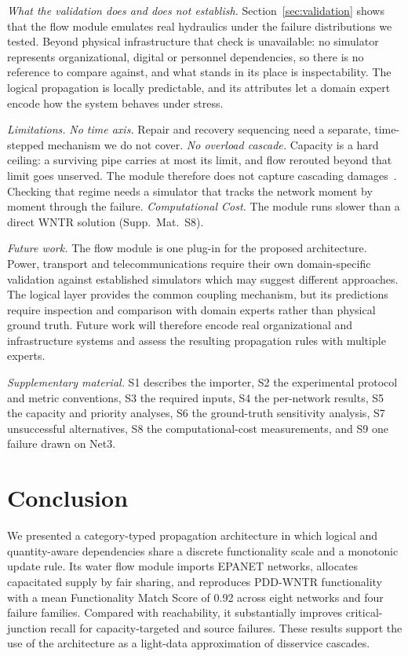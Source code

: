 \documentclass{svproc}
\begin{document}
\emph{What the validation does and does not establish.} Section~\ref{sec:validation}
shows that the flow module emulates real hydraulics under the failure distributions we
tested. Beyond physical infrastructure that check is unavailable: no simulator represents
organizational, digital or personnel dependencies, so there is no reference to compare
against, and what stands in its place is inspectability. The logical propagation is locally predictable,
and its attributes let a domain expert encode how the system behaves under stress.

\emph{Limitations.} \emph{No time axis.} Repair and recovery sequencing need a separate, time-stepped
mechanism we do not cover. \emph{No overload cascade.} Capacity is
a hard ceiling: a surviving pipe carries at most its limit, and flow rerouted beyond
that limit goes unserved. The module therefore does not capture cascading damages~\cite{shuang_performance_2014,li_cascading_2025}.
Checking that regime needs a simulator that tracks the network moment by moment through the failure. \emph{Computational Cost.} The module runs slower than a direct WNTR solution (Supp.~Mat.~S8).

\emph{Future work.} The flow module is one plug-in for the proposed
architecture. Power, transport and telecommunications require their own 
domain-specific validation against established simulators which may suggest different approaches.
The logical layer provides the common coupling mechanism, but its
predictions require inspection and comparison with domain experts rather
than physical ground truth. Future work will therefore encode real
organizational and infrastructure systems and assess the resulting
propagation rules with multiple experts.

\emph{Supplementary material.} S1 describes the importer, S2 the
experimental protocol and metric conventions, S3 the required inputs,
S4 the per-network results, S5 the capacity and priority analyses, S6
the ground-truth sensitivity analysis, S7 unsuccessful alternatives,
S8 the computational-cost measurements, and S9 one failure drawn on Net3.


\section{Conclusion}\label{sec:conclusion}
We presented a category-typed propagation architecture in which logical
and quantity-aware dependencies share a discrete functionality scale
and a monotonic update rule. Its water flow module imports EPANET
networks, allocates capacitated supply by fair sharing, and reproduces
PDD-WNTR functionality with a mean Functionality Match Score of 0.92 across eight networks
and four failure families. Compared with reachability, it substantially
improves critical-junction recall for capacity-targeted and source
failures. These results support the use of the architecture as a
light-data approximation of disservice cascades.
\end{document}
